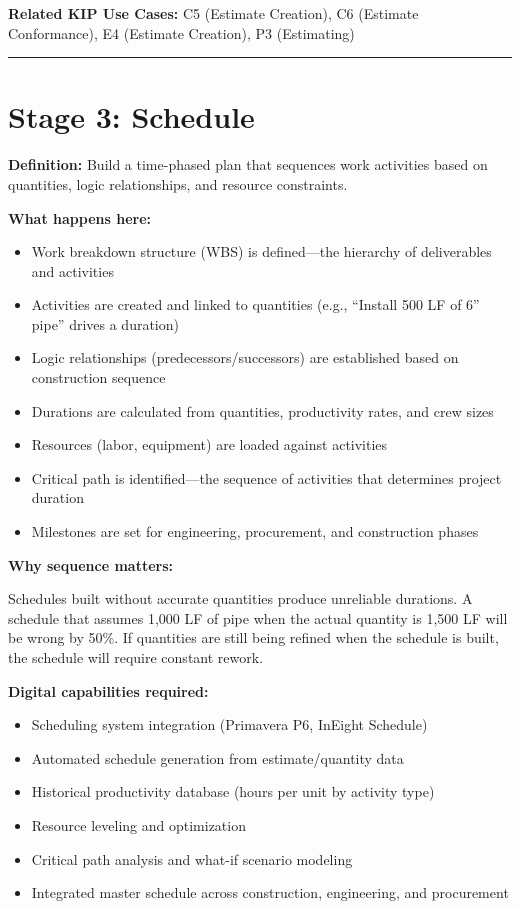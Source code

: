\documentclass[11pt, letterpaper]{article}
\begin{document}
\textbf{Related KIP Use Cases:} C5 (Estimate Creation), C6 (Estimate Conformance), E4 (Estimate Creation), P3 (Estimating)

\vspace{1em}

\hrule

\vspace{1em}

\section*{Stage 3: Schedule}

\textbf{Definition:} Build a time-phased plan that sequences work activities based on quantities, logic relationships, and resource constraints.

\textbf{What happens here:}
\begin{itemize}
    \item Work breakdown structure (WBS) is defined---the hierarchy of deliverables and activities
    \item Activities are created and linked to quantities (e.g., ``Install 500 LF of 6'' pipe'' drives a duration)
    \item Logic relationships (predecessors/successors) are established based on construction sequence
    \item Durations are calculated from quantities, productivity rates, and crew sizes
    \item Resources (labor, equipment) are loaded against activities
    \item Critical path is identified---the sequence of activities that determines project duration
    \item Milestones are set for engineering, procurement, and construction phases
\end{itemize}

\textbf{Why sequence matters:}

Schedules built without accurate quantities produce unreliable durations. A schedule that assumes 1,000 LF of pipe when the actual quantity is 1,500 LF will be wrong by 50\%. If quantities are still being refined when the schedule is built, the schedule will require constant rework.

\textbf{Digital capabilities required:}
\begin{itemize}
    \item Scheduling system integration (Primavera P6, InEight Schedule)
    \item Automated schedule generation from estimate/quantity data
    \item Historical productivity database (hours per unit by activity type)
    \item Resource leveling and optimization
    \item Critical path analysis and what-if scenario modeling
    \item Integrated master schedule across construction, engineering, and procurement
\end{itemize}
\end{document}
